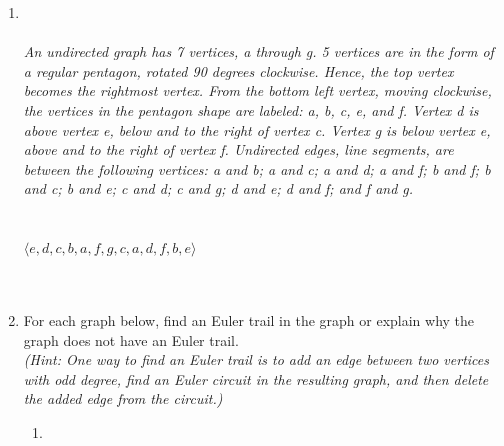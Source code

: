 \documentclass{amsart}
\theoremstyle{definition}
\theoremstyle{Exercise}
\theoremstyle{remark}
\theoremstyle{rule}
\numberwithin{equation}{section}
\begin{document}
\begin{enumerate}[label=(\alph*)]
\newpage
\item
{}\\\\
{\color{blue}{\bf Figure 10:} \emph{An undirected graph has 7 vertices, a through g. 5 vertices are in the form of a regular pentagon, rotated 90 degrees clockwise. Hence, the top vertex becomes the rightmost vertex. From the bottom left vertex, moving clockwise, the vertices in the pentagon shape are labeled: a, b, c, e, and f. Vertex d is above vertex e, below and to the right of vertex c. Vertex g is below vertex e, above and to the right of vertex f. Undirected edges, line segments, are between the following vertices: a and b; a and c; a and d; a and f; b and f; b and c; b and e; c and d; c and g; d and e; d and f; and f and g.
\\
}
}
\\
\\
$\langle e, d, c, b, a, f, g, c, a, d, f, b, e \rangle$\\
\\\\

\newpage

\item
For each graph below, find an Euler trail in the graph or explain why the graph does not have an Euler trail.\\

{\it (Hint: One way to find an Euler trail is to add an edge between two vertices with odd degree, find an Euler circuit in the resulting graph, and then delete the added edge from the circuit.)}\\
\begin{enumerate}[label=(\roman*)]
\item
{}
\end{enumerate}
\end{enumerate}
\end{document}
